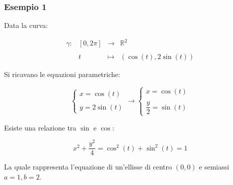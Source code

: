 \documentclass[a4paper]{article}
\begin{document}
	\newpage
	
	\subsubsection[Esempio 1]{\textcolor{Green4}{Esempio 1}}
	
	Data la curva:
	
	\begin{equation*}
		\begin{array}{llll}
			\gamma:	& \left[0,2\pi\right]	& \longrightarrow	& \mathbb{R}^{2} \\
			&&& \\
					& t						& \longmapsto		& \left(\cos\left(t\right), 2 \sin\left(t\right)\right)
		\end{array}
	\end{equation*}
	
	\noindent
	Si ricavano le equazioni parametriche:
	
	\begin{equation*}
		\begin{cases}
			x = \cos\left(t\right) \\
			\\
			y = 2\sin\left(t\right)
		\end{cases}
		\longrightarrow
		\begin{cases}
			x = \cos\left(t\right) \\
			\\
			\dfrac{y}{2} = \sin\left(t\right)
		\end{cases}
	\end{equation*}

	\noindent
	Esiste una relazione tra $\sin$ e $\cos$:
	
	\begin{equation*}
		x^{2} + \dfrac{y^{2}}{4} = \cos^{2}\left(t\right) + \sin^{2}\left(t\right) = 1
	\end{equation*}

	\noindent
	La quale rappresenta l'equazione di un'ellisse di centro $\left(0,0\right)$ e semiassi $a = 1, b = 2$.
	
\end{document}
